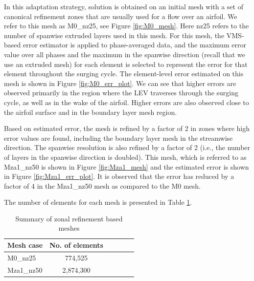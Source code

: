 In this adaptation strategy, solution is obtained on an initial mesh with  a set of canonical refinement zones that are usually used for a flow over an airfoil. We refer to this mesh as M0\_nz25, see Figure \ref{fig:M0_mesh}. 
Here nz25 refers to the number of spanwise extruded layers used in this mesh. 
For this mesh, the VMS-based error estimator is applied to phase-averaged data, and the maximum error value over all phases and the maximum in the spanwise direction (recall that we use an extruded mesh) for each element is selected to represent the error for that element throughout the surging cycle. 
The element-level error estimated on this mesh is shown in Figure \ref{fig:M0_err_plot}. 
We can see that higher errors are observed primarily in the region where the LEV traverses through the surging cycle, as well as in the wake of the airfoil. 
Higher errors are also observed close to the airfoil surface and in the boundary layer mesh region.

Based on estimated error, the mesh is refined by a factor of 2 in zones where high error values are found, including the boundary layer mesh in the streamwise direction. 
The spanwise resolution is also refined by a factor of 2 (i.e., the number of layers in the spanwise direction is doubled). 
This mesh, which is referred to as Mza1\_nz50 is shown in Figure \ref{fig:Mza1_mesh} and the estimated error is shown in Figure \ref{fig:Mza1_err_plot}. 
It is observed that the error has reduced by a factor of 4 in the Mza1\_nz50 mesh as compared to the M0 mesh.


The number of elements for each mesh is presented in Table \ref{table:mesh_zonal_summary}.

\begin{table}[H]
	\centering
	\caption{Summary of zonal refinement based meshes}
	\label{table:mesh_zonal_summary}
	\begin{tabular}{|l|c|c|c|c|c|}
		\hline
		Mesh case  & No. of elements\\
		\hline
		\hline
		M0\_nz25 & 774,525 \\
		\hline
		Mza1\_nz50 &  2,874,300 \\
		\hline
	\end{tabular}
	
\end{table}

